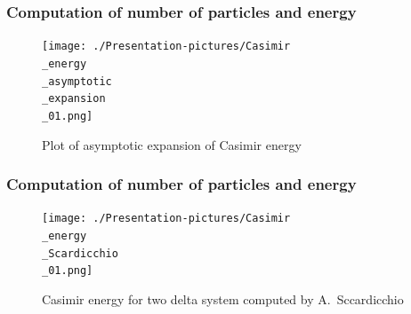 \documentclass[10pt,t]{beamer}
\begin{document}
\begin{frame}
  \frametitle{Computation of number of particles and energy}


  \begin{figure}

    \label{fig:aaa}

    \centering


    \texttt{[image: ./Presentation-pictures/Casimir\\\_energy\\\_asymptotic\\\_expansion\\\_01.png]}

    \caption{Plot of asymptotic expansion of Casimir energy}


  \end{figure}

\end{frame}





\begin{frame}
  \frametitle{Computation of number of particles and energy}


  \begin{figure}

    \label{fig:aaa}

    \centering


    \texttt{[image: ./Presentation-pictures/Casimir\\\_energy\\\_Scardicchio\\\_01.png]}

    \caption{Casimir energy for two delta system computed by
      A.~Sccardicchio}


  \end{figure}

\end{frame}
\end{document}
